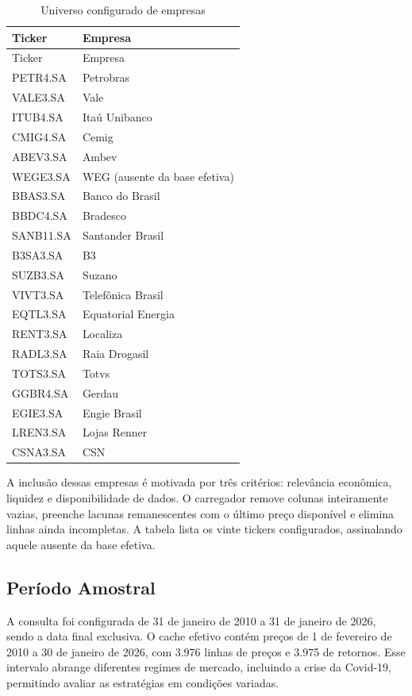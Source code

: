 \documentclass[12pt,a4paper]{article}
\begin{document}
\begin{longtable}{ll}
\caption{Universo configurado de empresas} \\
\toprule
Ticker & Empresa \\
\midrule
\endfirsthead
\toprule
Ticker & Empresa \\
\midrule
\endhead
PETR4.SA & Petrobras \\
VALE3.SA & Vale \\
ITUB4.SA & Itaú Unibanco \\
CMIG4.SA & Cemig \\
ABEV3.SA & Ambev \\
WEGE3.SA & WEG (ausente da base efetiva) \\
BBAS3.SA & Banco do Brasil \\
BBDC4.SA & Bradesco \\
SANB11.SA & Santander Brasil \\
B3SA3.SA & B3 \\
SUZB3.SA & Suzano \\
VIVT3.SA & Telefônica Brasil \\
EQTL3.SA & Equatorial Energia \\
RENT3.SA & Localiza \\
RADL3.SA & Raia Drogasil \\
TOTS3.SA & Totvs \\
GGBR4.SA & Gerdau \\
EGIE3.SA & Engie Brasil \\
LREN3.SA & Lojas Renner \\
CSNA3.SA & CSN \\
\bottomrule
\end{longtable}

A inclusão dessas empresas é motivada por três critérios: relevância econômica, liquidez e disponibilidade de dados. O carregador remove colunas inteiramente vazias, preenche lacunas remanescentes com o último preço disponível e elimina linhas ainda incompletas. A tabela lista os vinte tickers configurados, assinalando aquele ausente da base efetiva.

\subsection{Período Amostral}

A consulta foi configurada de 31 de janeiro de 2010 a 31 de janeiro de 2026, sendo a data final exclusiva. O cache efetivo contém preços de 1 de fevereiro de 2010 a 30 de janeiro de 2026, com 3.976 linhas de preços e 3.975 de retornos. Esse intervalo abrange diferentes regimes de mercado, incluindo a crise da Covid-19, permitindo avaliar as estratégias em condições variadas.
\end{document}
